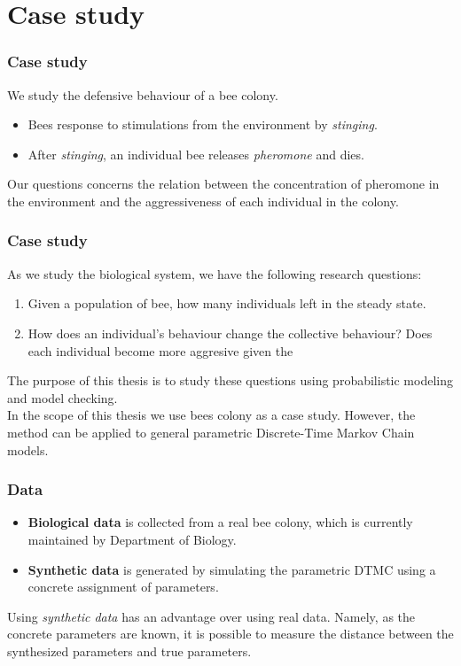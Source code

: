 \documentclass{beamer}
\begin{document}
\section{Case study}
\begin{frame}
  \frametitle{Case study}
  We study the defensive behaviour of a bee colony.
  \begin{itemize}
  \item Bees response to stimulations from the environment by \textit{stinging}.
  \item After \textit{stinging}, an individual bee releases \textit{pheromone}
    and dies.
  \end{itemize}
  Our questions concerns the relation between the concentration of pheromone in
  the environment and the aggressiveness of each individual in the colony.
\end{frame}

\begin{frame}
  \frametitle{Case study}
  As we study the biological system, we have the following research questions:
  \begin{enumerate}
  \item Given a population of bee, how many individuals left in the steady
    state.
  \item How does an individual's behaviour change the collective behaviour? Does
    each individual become more aggresive given the
  \end{enumerate}
  The purpose of this thesis is to study these questions using probabilistic
  modeling and model checking.\\
  In the scope of this thesis we use bees colony as a case study. However, the
  method can be applied to general parametric Discrete-Time Markov Chain models.
\end{frame}

\begin{frame}
  \frametitle{Data}
  \begin{itemize}
  \item \textbf{Biological data} is collected from a real bee colony, which is
    currently maintained by Department of Biology.
  \item \textbf{Synthetic data} is generated by simulating the parametric DTMC
    using a concrete assignment of parameters.
  \end{itemize}
  Using \textit{synthetic data} has an advantage over using real data. Namely,
  as the concrete parameters are known, it is possible to measure the distance
  between the synthesized parameters and true parameters.
\end{frame}
\end{document}
